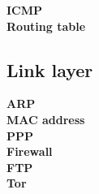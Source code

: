     \textbf{ICMP} \\
    
   \textbf{Routing table} \\
   
    
    
    \subsection{Link layer}
    \textbf{ARP} \\
    
    \textbf{MAC address} \\
    
    \textbf{PPP} \\
    





\textbf{Firewall} \\

\textbf{FTP} \\


\textbf{Tor} \\





\newpage


